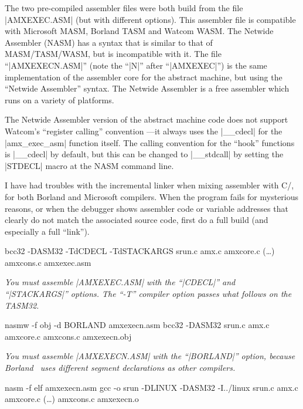    
The two pre-compiled assembler files were both build from the file |AMXEXEC.ASM|
(but with different options). This assembler file is compatible with Microsoft MASM,
Borland TASM and Watcom WASM. The Netwide Assembler (NASM) has a syntax that is
similar to that of MASM\slash TASM\slash WASM, but is incompatible with it. The
file ``|AMXEXECN.ASM|'' (note the ``|N|'' after ``|AMXEXEC|'') is the same
implementation of the assembler core for the abstract machine, but using the
``Netwide Assembler'' syntax. The Netwide Assembler is a free assembler which
runs on a variety of platforms.

The Netwide Assembler version of the abstract machine code does not support
Watcom's ``register calling'' convention ---it always uses the |__cdecl| for
the |amx_exec_asm| function itself. The calling convention for the ``hook''
functions is |__cdecl| by default, but this can be changed to |__stdcall| by
setting the |STDECL| macro at the NASM command line.

I have had troubles with the incremental linker when mixing assembler with
C/\Cpp, for both Borland and Microsoft compilers. When the program fails for
mysterious reasons, or when the debugger shows assembler code or variable
addresses that clearly do not match the associated source code, first do
a full build (and especially a full ``link'').

\beginlist{40pt}
 \lbreak
        {\smalltt bcc32 -DASM32 -TdCDECL -TdSTACKARGS srun.c amx.c amxcore.c {\sevenit (\dots)}\lbreak{\sevenit (\dots)} amxcons.c amxexec.asm}

        {\it You must assemble |AMXEXEC.ASM| with the ``|CDECL|'' and ``|STACKARGS|''
        options. The ``-T'' compiler option passes what follows on the TASM32.}

 \lbreak
        {\smalltt nasmw -f obj -d BORLAND amxexecn.asm} \lbreak
        {\smalltt bcc32 -DASM32 srun.c amx.c amxcore.c amxcons.c amxexecn.obj}

        {\it You must assemble |AMXEXECN.ASM| with the ``|BORLAND|'' option,
        because Borland \Cpp\ uses different segment declarations as other
        compilers.}

 \lbreak
        {\smalltt nasm -f elf amxexecn.asm} \lbreak
        {\smalltt gcc -o srun -DLINUX -DASM32 -I../linux srun.c amx.c amxcore.c {\sevenit (\dots)}\lbreak{\sevenit (\dots)} amxcons.c amxexecn.o}

